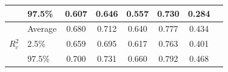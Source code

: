 \begin{table}[!ht]
\begin{tabular}{@{}llcccccc@{}}
                                           & 97.5\%  & 0.607 & 0.646 & 0.557 & 0.730 & 0.284 \\ \midrule
      \multirow{3}{*}{$R^2_c$}            & Average & 0.680 & 0.712 & 0.640 & 0.777 & 0.434 \\
                                           & 2.5\%   & 0.659 & 0.695 & 0.617 & 0.763 & 0.401 \\
                                           & 97.5\%  & 0.700 & 0.731 & 0.660 & 0.792 & 0.468 \\ \bottomrule
    \end{tabular}

\end{table}

